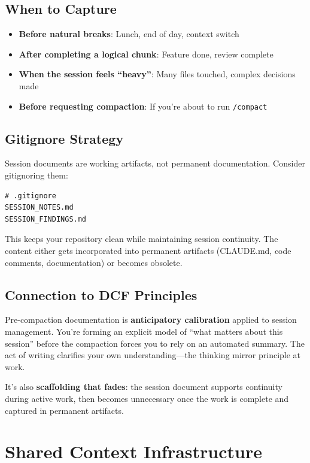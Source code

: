 \subsection{When to Capture}

\begin{itemize}
    \item \textbf{Before natural breaks}: Lunch, end of day, context switch
    \item \textbf{After completing a logical chunk}: Feature done, review complete
    \item \textbf{When the session feels ``heavy''}: Many files touched, complex decisions made
    \item \textbf{Before requesting compaction}: If you're about to run \texttt{/compact}
\end{itemize}

\subsection{Gitignore Strategy}

Session documents are working artifacts, not permanent documentation. Consider gitignoring them:

\begin{lstlisting}
# .gitignore
SESSION_NOTES.md
SESSION_FINDINGS.md
\end{lstlisting}

This keeps your repository clean while maintaining session continuity. The content either gets incorporated into permanent artifacts (CLAUDE.md, code comments, documentation) or becomes obsolete.

\subsection{Connection to DCF Principles}

Pre-compaction documentation is \textbf{anticipatory calibration} applied to session management. You're forming an explicit model of ``what matters about this session'' before the compaction forces you to rely on an automated summary. The act of writing clarifies your own understanding---the thinking mirror principle at work.

It's also \textbf{scaffolding that fades}: the session document supports continuity during active work, then becomes unnecessary once the work is complete and captured in permanent artifacts.

\section{Shared Context Infrastructure}\label{sec:shared-context}

